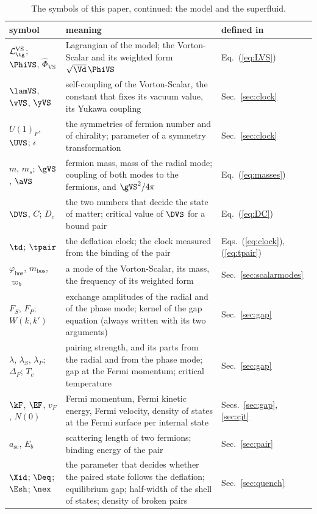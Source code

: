 \begin{table}
\caption{\label{tab:symbols2}The symbols of this paper, continued: the model and the superfluid.}
\begin{ruledtabular}
\begin{tabular}{p{}p{}p{}}
symbol & meaning & defined in \\
\hline
$\mathcal L_{\tg}^{\mathrm{VS}}$; $\PhiVS$, $\hat\Phi_{\mathrm{VS}}$ & Lagrangian of the model; the Vorton-Scalar and its weighted form $\sqrt{\Vd}\,\PhiVS$ & Eq.~(\ref{eq:LVS}) \\
$\lamVS$, $\vVS$, $\yVS$ & self-coupling of the Vorton-Scalar, the constant that fixes its vacuum value, its Yukawa coupling & Sec.~\ref{sec:clock} \\
$U(1)_F$, $\UVS$; $\epsilon$ & the symmetries of fermion number and of chirality; parameter of a symmetry transformation & Sec.~\ref{sec:clock} \\
$m$, $m_s$; $\gVS$, $\aVS$ & fermion mass, mass of the radial mode; coupling of both modes to the fermions, and $\gVS^{2}/4\pi$ & Eq.~(\ref{eq:masses}) \\
$\DVS$, $C$; $D_c$ & the two numbers that decide the state of matter; critical value of $\DVS$ for a bound pair & Eq.~(\ref{eq:DC}) \\
$\td$; $\tpair$ & the deflation clock; the clock measured from the binding of the pair & Eqs.~(\ref{eq:clock}), (\ref{eq:tpair}) \\
$\varphi_{\mathrm{bos}}$, $m_{\mathrm{bos}}$, $\varpi_b$ & a mode of the Vorton-Scalar, its mass, the frequency of its weighted form & Sec.~\ref{sec:scalarmodes} \\
$F_S$, $F_P$; $W(k,k')$ & exchange amplitudes of the radial and of the phase mode; kernel of the gap equation (always written with its two arguments) & Sec.~\ref{sec:gap} \\
$\lambda$, $\lambda_S$, $\lambda_P$; $\Delta_F$; $T_c$ & pairing strength, and its parts from the radial and from the phase mode; gap at the Fermi momentum; critical temperature & Sec.~\ref{sec:gap} \\
$\kF$, $\EF$, $v_F$, $N(0)$ & Fermi momentum, Fermi kinetic energy, Fermi velocity, density of states at the Fermi surface per internal state & Secs.~\ref{sec:gap}, \ref{sec:cjt} \\
$a_{\mathrm{sc}}$, $E_b$ & scattering length of two fermions; binding energy of the pair & Sec.~\ref{sec:pair} \\
$\Xid$; $\Deq$; $\Esh$; $\nex$ & the parameter that decides whether the paired state follows the deflation; equilibrium gap; half-width of the shell of states; density of broken pairs & Sec.~\ref{sec:quench} \\

\end{tabular}
\end{ruledtabular}
\end{table}

